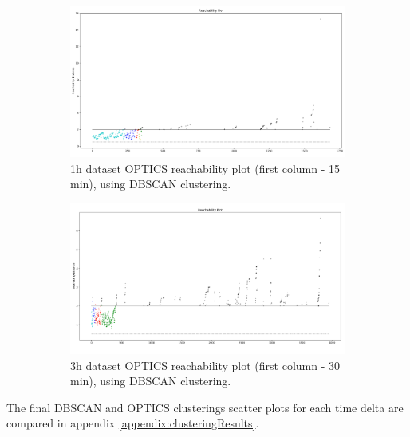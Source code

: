 \begin{figure}[H]
  \centering
  \begin{subfigure}{.5\textwidth}\captionsetup{width=.8\linewidth}
    \centering
    \includegraphics[width=1\textwidth]{./images/clusteringResults/1h-1-reachabilityPlot.png}
  \caption{1h dataset OPTICS reachability plot (first column - 15 min), using DBSCAN clustering.}
  \end{subfigure}%
  \hfill
  \begin{subfigure}{.5\textwidth}\captionsetup{width=.8\linewidth}
    \centering
    \includegraphics[width=1\textwidth]{./images/clusteringResults/3h-1-reachabilityPlot.png}
    \caption{3h dataset OPTICS reachability plot (first column - 30 min), using DBSCAN clustering.}
  \end{subfigure}
  \caption{}
  \label{figure:OPTICSResultsReachabilityPlot}
  \end{figure}


The final DBSCAN and OPTICS clusterings scatter plots for each time delta are compared in appendix \ref{appendix:clusteringResults}.
